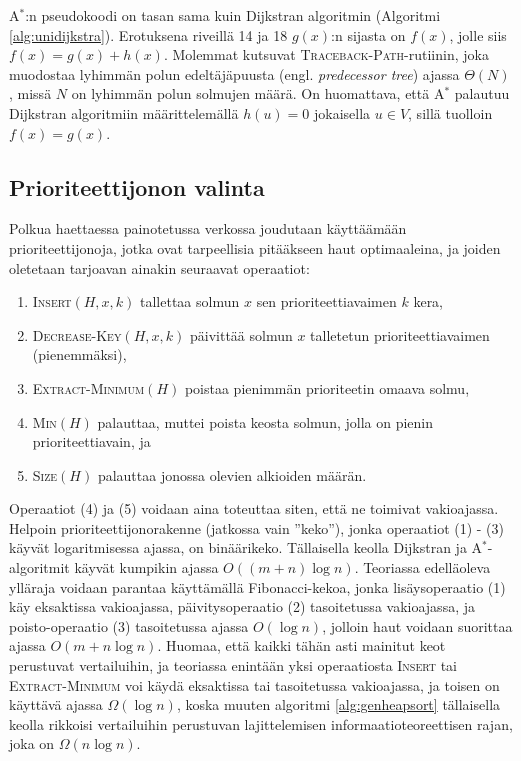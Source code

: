 \documentclass[finnish]{tktltiki2}
\theoremstyle{definition}
\theoremstyle{remark}
\begin{document}
A$^{\ast}$:n pseudokoodi on tasan sama kuin Dijkstran algoritmin (Algoritmi \ref{alg:unidijkstra}). Erotuksena riveillä 14 ja 18 $g(x)$:n sijasta on $f(x)$, jolle siis $f(x) = g(x) + h(x)$. Molemmat kutsuvat \textsc{Traceback-Path}-rutiinin, joka muodostaa lyhimmän polun edeltäjäpuusta (engl. \textit{predecessor tree}) ajassa $\Theta(N)$, missä $N$ on lyhimmän polun solmujen määrä. On huomattava, että A$^{\ast}$ palautuu Dijkstran algoritmiin määrittelemällä $h(u) = 0$ jokaisella $u \in V$, sillä tuolloin $f(x) = g(x)$.

\subsection{Prioriteettijonon valinta}
Polkua haettaessa painotetussa verkossa joudutaan käyttäämään prioriteettijonoja, jotka ovat tarpeellisia pitääkseen haut optimaaleina, ja joiden oletetaan tarjoavan ainakin seuraavat operaatiot:
\begin{enumerate}
\item \textsc{Insert}$(H, x, k)$ tallettaa solmun $x$ sen prioriteettiavaimen $k$ kera,
\item \textsc{Decrease-Key}$(H, x, k)$ päivittää solmun $x$ talletetun prioriteettiavaimen (pienemmäksi),
\item \textsc{Extract-Minimum}$(H)$ poistaa pienimmän prioriteetin omaava solmu, 
\item \textsc{Min}$(H)$ palauttaa, muttei poista keosta solmun, jolla on pienin prioriteettiavain, ja
\item \textsc{Size}$(H)$ palauttaa jonossa olevien alkioiden määrän.
\end{enumerate}
Operaatiot (4) ja (5) voidaan aina toteuttaa siten, että ne toimivat vakioajassa. Helpoin prioriteettijonorakenne (jatkossa vain ''keko''), jonka operaatiot (1) - (3) käyvät logaritmisessa ajassa, on binäärikeko. Tällaisella keolla Dijkstran ja A$^{\ast}$-algoritmit käyvät kumpikin ajassa $O((m + n) \log n)$. Teoriassa edelläoleva ylläraja voidaan parantaa käyttämällä Fibonacci-kekoa, jonka lisäysoperaatio (1) käy eksaktissa vakioajassa, päivitysoperaatio (2) tasoitetussa vakioajassa, ja poisto-operaatio (3) tasoitetussa ajassa $O(\log n)$, jolloin haut voidaan suorittaa ajassa $O(m + n \log n)$. Huomaa, että kaikki tähän asti mainitut keot perustuvat vertailuihin, ja teoriassa enintään yksi operaatiosta \textsc{Insert} tai \textsc{Extract-Minimum} voi käydä eksaktissa tai tasoitetussa vakioajassa, ja toisen on käyttävä ajassa $\Omega(\log n)$, koska muuten algoritmi \ref{alg:genheapsort} tällaisella keolla rikkoisi vertailuihin perustuvan lajittelemisen informaatioteoreettisen rajan, joka on $\Omega(n \log n)$.
\end{document}
